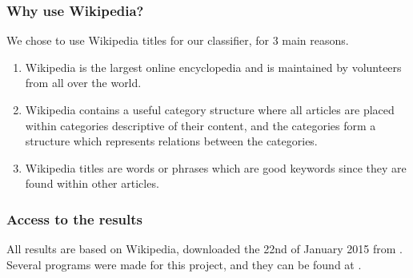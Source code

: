 
\subsubsection{Why use Wikipedia?}
We chose to use Wikipedia titles for our classifier, for 3 main reasons.
\begin{enumerate}
\item Wikipedia is the largest online encyclopedia and is maintained by volunteers from all over the world.
\item Wikipedia contains a useful category structure where all articles are placed within categories descriptive of their content, and the categories form a structure which represents relations between the categories. 
\item Wikipedia titles are words or phrases which are good keywords since they are found within other articles. 
\end{enumerate}


\subsubsection{Access to the results}
All results are based on Wikipedia, downloaded the 22nd of January 2015 from \enwikidatabasedumps. Several programs were made for this project, and they can be found at \ingridthesis.


